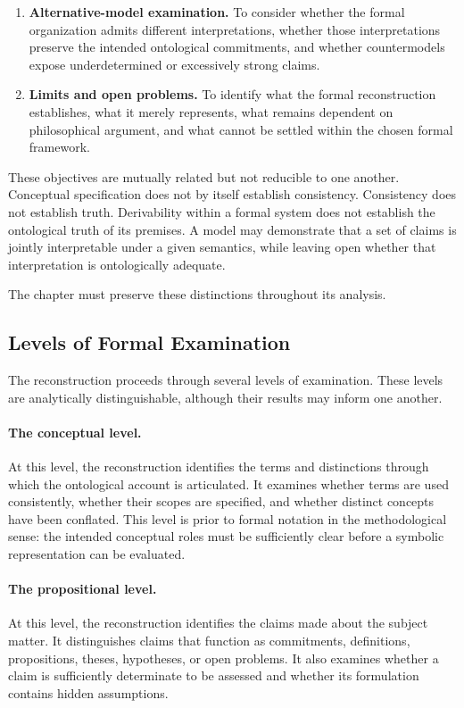\begin{enumerate}
    \item \textbf{Alternative-model examination.}
    To consider whether the formal organization admits different
    interpretations, whether those interpretations preserve the intended
    ontological commitments, and whether countermodels expose
    underdetermined or excessively strong claims.

    \item \textbf{Limits and open problems.}
    To identify what the formal reconstruction establishes, what it merely
    represents, what remains dependent on philosophical argument, and what
    cannot be settled within the chosen formal framework.
\end{enumerate}

These objectives are mutually related but not reducible to one another.
Conceptual specification does not by itself establish consistency.
Consistency does not establish truth. Derivability within a formal system
does not establish the ontological truth of its premises. A model may
demonstrate that a set of claims is jointly interpretable under a given
semantics, while leaving open whether that interpretation is ontologically
adequate.

The chapter must preserve these distinctions throughout its analysis.

\subsection{Levels of Formal Examination}

The reconstruction proceeds through several levels of examination. These
levels are analytically distinguishable, although their results may inform
one another.

\paragraph{The conceptual level.}
At this level, the reconstruction identifies the terms and distinctions
through which the ontological account is articulated. It examines whether
terms are used consistently, whether their scopes are specified, and
whether distinct concepts have been conflated. This level is prior to
formal notation in the methodological sense: the intended conceptual roles
must be sufficiently clear before a symbolic representation can be
evaluated.

\paragraph{The propositional level.}
At this level, the reconstruction identifies the claims made about the
subject matter. It distinguishes claims that function as commitments,
definitions, propositions, theses, hypotheses, or open problems. It also
examines whether a claim is sufficiently determinate to be assessed and
whether its formulation contains hidden assumptions.

